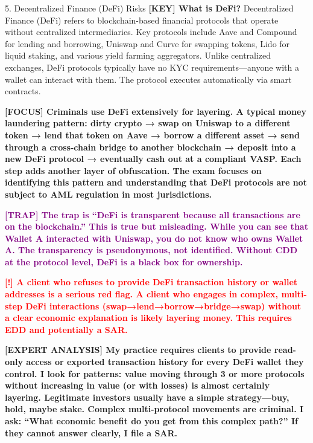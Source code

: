 \documentclass[11pt,a4paper]{beamer}
\newcommand{\redflag}[1]{\textcolor{red}{\textbf{[!] #1}}}
\newcommand{\examfocus}[1]{\textcolor{orange!80!black}{\textbf{[FOCUS] #1}}}
\newcommand{\trap}[1]{\textcolor{purple}{\textbf{[TRAP] #1}}}
\newcommand{\keyterm}[1]{\textcolor{red!80!black}{\textbf{[KEY] #1}}}
\newcommand{\expert}[1]{\textcolor{blue!70!black}{\textbf{[EXPERT ANALYSIS] #1}}}
\begin{document}
	\begin{frame}{5. Decentralized Finance (DeFi) Risks}
		\tiny
		\keyterm{What is DeFi?} Decentralized Finance (DeFi) refers to blockchain-based financial protocols that operate without centralized intermediaries. Key protocols include Aave and Compound for lending and borrowing, Uniswap and Curve for swapping tokens, Lido for liquid staking, and various yield farming aggregators. Unlike centralized exchanges, DeFi protocols typically have no KYC requirements—anyone with a wallet can interact with them. The protocol executes automatically via smart contracts.
		
		\vspace{0.1cm}
		\examfocus{Criminals use DeFi extensively for layering. A typical money laundering pattern: dirty crypto → swap on Uniswap to a different token → lend that token on Aave → borrow a different asset → send through a cross-chain bridge to another blockchain → deposit into a new DeFi protocol → eventually cash out at a compliant VASP. Each step adds another layer of obfuscation. The exam focuses on identifying this pattern and understanding that DeFi protocols are not subject to AML regulation in most jurisdictions.}
		
		\vspace{0.1cm}
		\trap{The trap is “DeFi is transparent because all transactions are on the blockchain.” This is true but misleading. While you can see that Wallet A interacted with Uniswap, you do not know who owns Wallet A. The transparency is pseudonymous, not identified. Without CDD at the protocol level, DeFi is a black box for ownership.}
		
		\vspace{0.1cm}
		\redflag{A client who refuses to provide DeFi transaction history or wallet addresses is a serious red flag. A client who engages in complex, multi-step DeFi interactions (swap→lend→borrow→bridge→swap) without a clear economic explanation is likely layering money. This requires EDD and potentially a SAR.}
		
		\vspace{0.1cm}
		\expert{My practice requires clients to provide read-only access or exported transaction history for every DeFi wallet they control. I look for patterns: value moving through 3 or more protocols without increasing in value (or with losses) is almost certainly layering. Legitimate investors usually have a simple strategy—buy, hold, maybe stake. Complex multi-protocol movements are criminal. I ask: “What economic benefit do you get from this complex path?” If they cannot answer clearly, I file a SAR.}
	\end{frame}
	
\end{document}
